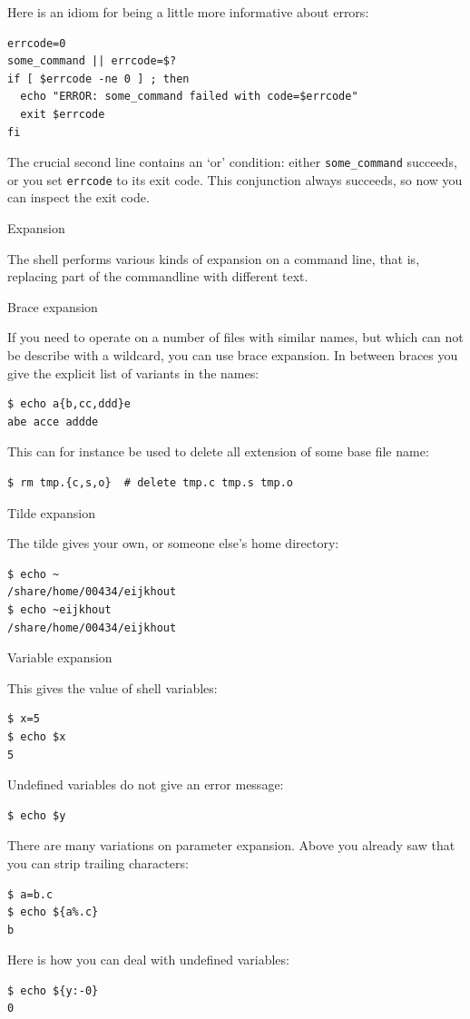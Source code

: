 Here is an idiom for being a little more informative
about errors:
\begin{lstlisting}
errcode=0
some_command || errcode=$?
if [ $errcode -ne 0 ] ; then
  echo "ERROR: some_command failed with code=$errcode"
  exit $errcode
fi
\end{lstlisting}
The crucial second line contains an `or' condition:
either \lstinline{some_command} succeeds,
or you set \lstinline{errcode} to its exit code.
This conjunction always succeeds, so now you can inspect
the exit code.

 {Expansion}
\label{tut:unix-expansion}

The shell performs various kinds of expansion on a command line, that
is, replacing part of the commandline with different text.

 {Brace expansion}

If you need to operate on a number of files with similar names,
but which can not be describe with a wildcard, you can use brace expansion.
In between braces you give the explicit list of variants in the names:

\begin{lstlisting}
$ echo a{b,cc,ddd}e
abe acce addde
\end{lstlisting}
This can for instance be used to delete all extension of some base
file name:
\begin{lstlisting}
$ rm tmp.{c,s,o}  # delete tmp.c tmp.s tmp.o
\end{lstlisting}

 {Tilde expansion}

The tilde gives your own, or someone else's home directory:
\begin{lstlisting}
$ echo ~
/share/home/00434/eijkhout
$ echo ~eijkhout
/share/home/00434/eijkhout
\end{lstlisting}

 {Variable expansion}

This gives the value of shell variables:
\begin{lstlisting}
$ x=5
$ echo $x
5
\end{lstlisting}
Undefined variables do not give an error message:
\begin{lstlisting}
$ echo $y
\end{lstlisting}
There are many variations on parameter expansion. Above you already
saw that you can strip trailing characters:
\begin{lstlisting}
$ a=b.c
$ echo ${a%.c}
b
\end{lstlisting}
Here is how you can deal with undefined variables:
\begin{lstlisting}
$ echo ${y:-0}
0
\end{lstlisting}

